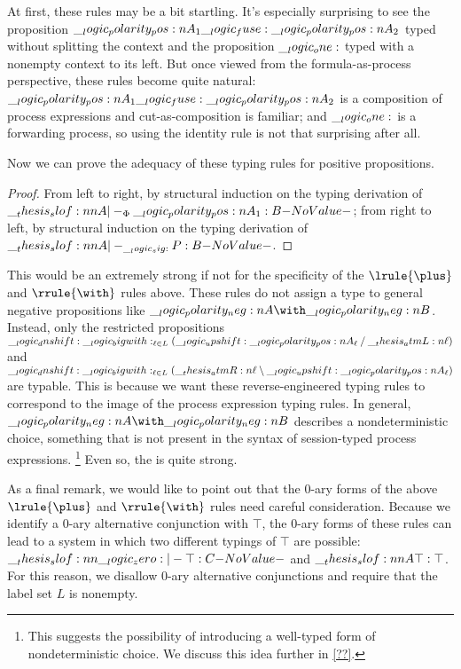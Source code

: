 At first, these rules may be a bit startling.
It's especially surprising to see the proposition $\__logic_polarity_pos:n {A}_1 \__logic_fuse: \__logic_polarity_pos:n {A}_2$ typed without splitting the context and the proposition $\__logic_one:$ typed with a nonempty context to its left.
But once viewed from the formula-as-process perspective, these rules become quite natural: $\__logic_polarity_pos:n {A}_1 \__logic_fuse: \__logic_polarity_pos:n {A}_2$ is a composition of process expressions and cut-as-composition is familiar; and $\__logic_one:$ is a forwarding process, so using the identity rule is not that surprising after all.

Now we can prove the adequacy of these typing rules for positive propositions.
%
\thmembedtypeprops*
\begin{proof}
  From left to right, by structural induction on the typing derivation of $\slof{A |-_{\orsig} \p{A}_1 : B}$;
  from right to left, by structural induction on the typing derivation of $\slof{A |-_{\sig} P : B}$.
\end{proof}
%
This would be an extremely strong  if not for the specificity of the $\lrule{\plus}$ and $\rrule{\with}$ rules above.
These rules do not assign a type to general negative propositions like $\n{A} \with \n{B}$.
Instead, only the restricted propositions $\__logic_dnshift: {\textstyle \__logic_bigwith:_{\ell \in L}(\__logic_upshift: \__logic_polarity_pos:n {A}_{\ell} \mathbin { / } \__thesis_atmL:n {\ell})}$ and $\__logic_dnshift: {\textstyle \__logic_bigwith:_{\ell \in L}(\__thesis_atmR:n {\ell} \mathbin { \setminus } \__logic_upshift: \__logic_polarity_pos:n {A}_{\ell})}$ are typable.
This is because we want these reverse-engineered typing rules to correspond to the image of the process expression typing rules.
In general, $\n{A} \with \n{B}$ describes a nondeterministic choice, something that is not present in the syntax of session-typed process expressions.%
\footnote{This suggests the possibility of introducing a well-typed form of nondeterministic choice.
  We discuss this idea further in \cref{??}.}
Even so, the  is quite strong.

As a final remark, we would like to point out that the $0$-ary forms of the above $\lrule{\plus}$ and $\rrule{\with}$ rules need careful consideration.
Because we identify a $0$-ary alternative conjunction with $\top$, the $0$-ary forms of these rules can lead to a system in which two different typings of $\top$ are possible: $\slof{\zero |- \top : C}$ and $\slof{A |- \top : \top}$.
For this reason, we disallow $0$-ary alternative conjunctions and require that the label set $L$ is nonempty.

